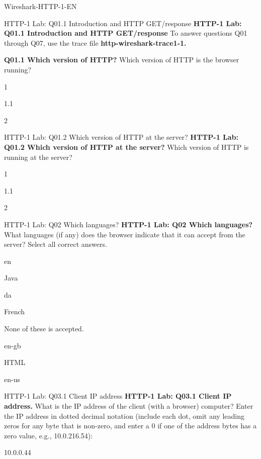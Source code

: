\documentclass[a4paper]{article}
\begin{document}
\begin{quiz}{Wireshark-HTTP-1-EN}

\begin{multi}[points=1,shuffle]{HTTP-1 Lab: Q01.1 Introduction and HTTP GET/response}
\textbf{HTTP-1 Lab: Q01.1 Introduction and HTTP GET/response}
To answer questions Q01 through Q07, use the trace file \textbf{http-wireshark-trace1-1.} 

\textbf{Q01.1 Which version of HTTP?} Which version of HTTP is the browser running?
\item 1
\item* 1.1
\item 2
\end{multi}

\begin{multi}[points=1,shuffle]{HTTP-1 Lab: Q01.2 Which version of HTTP at the server?}
\textbf{HTTP-1 Lab: Q01.2 Which version of HTTP at the server?} Which version of HTTP is running at the server? 
\item 1
\item* 1.1
\item 2
\end{multi}

\begin{multi}[points=1,shuffle,multiple]{HTTP-1 Lab: Q02 Which languages?}
\textbf{HTTP-1 Lab: Q02 Which languages?} What languages (if any) does the browser indicate that it can accept from the server? Select all correct answers.
\item* en
\item Java
\item da
\item French
\item None of these is accepted.
\item en-gb
\item HTML
\item* en-us
\end{multi}

\begin{shortanswer}[points=1]{HTTP-1 Lab: Q03.1 Client IP address}
\textbf{HTTP-1 Lab: Q03.1 Client IP address.} What is the IP address of the client (with a browser) computer? Enter the IP address in dotted decimal notation (include each dot, omit any leading zeros for any byte that is non-zero, and enter a 0 if one of the address bytes has a zero value, e.g., 10.0.216.54):
\item 10.0.0.44
\end{shortanswer}


\end{quiz}
\end{document}
